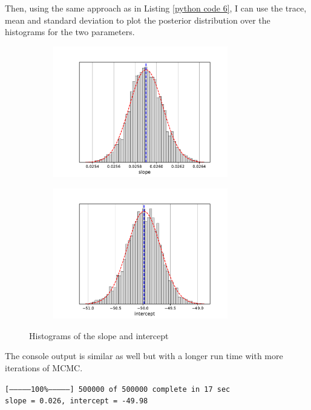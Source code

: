 \documentclass[12pt,twoside]{report}   %
\begin{document}
Then, using the same approach as in Listing \ref{python code 6}, I can use the trace, mean and standard deviation to plot the posterior distribution over the histograms for the two parameters.
\begin{figure}[H]
\centering
\begin{subfigure}{0.5\linewidth}
  \centering
  \includegraphics[width = 3in]{slope.pdf}
  \label{fig:subslope}
\end{subfigure}%
\begin{subfigure}{0.5\linewidth}
  \centering
  \includegraphics[width = 3in]{intercept.pdf}
  \label{fig:subintercept}
\end{subfigure}
\caption{Histograms of the slope and intercept}
\label{fig:histograms2}
\end{figure}

The console output is similar as well but with a longer run time with more iterations of MCMC.
\small \begin{tcolorbox}[colback=black!5,colframe=black!40!black,title=\texttt{Terminal}]
\texttt{[---------------100\%---------------] 500000 of 500000 complete in 17 sec\\
slope = 0.026, intercept = -49.98}
\end{tcolorbox}
\end{document}
